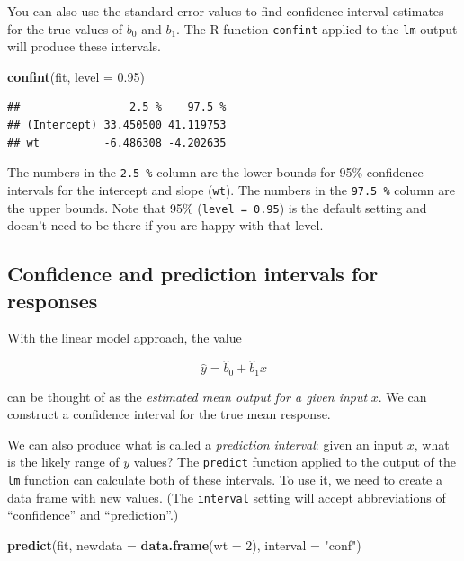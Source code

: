 \documentclass[
]{book}
\newenvironment{Shaded}{\begin{snugshade}}{\end{snugshade}}
\newcommand{\AttributeTok}[1]{\textcolor[rgb]{0.13,0.29,0.53}{#1}}
\newcommand{\DecValTok}[1]{\textcolor[rgb]{0.00,0.00,0.81}{#1}}
\newcommand{\FloatTok}[1]{\textcolor[rgb]{0.00,0.00,0.81}{#1}}
\newcommand{\FunctionTok}[1]{\textcolor[rgb]{0.13,0.29,0.53}{\textbf{#1}}}
\newcommand{\NormalTok}[1]{#1}
\newcommand{\StringTok}[1]{\textcolor[rgb]{0.31,0.60,0.02}{#1}}
\theoremstyle{definition}
\theoremstyle{definition}
\theoremstyle{definition}
\theoremstyle{definition}
\theoremstyle{remark}
\begin{document}
You can also use the standard error values to find confidence interval estimates for the true values of \(b_0\) and \(b_1\). The R function \texttt{confint} applied to the \texttt{lm} output will produce these intervals.

\begin{Shaded}
\begin{Highlighting}[]
\FunctionTok{confint}\NormalTok{(fit, }\AttributeTok{level =} \FloatTok{0.95}\NormalTok{)}
\end{Highlighting}
\end{Shaded}

\begin{verbatim}
##                 2.5 %    97.5 %
## (Intercept) 33.450500 41.119753
## wt          -6.486308 -4.202635
\end{verbatim}

The numbers in the \texttt{2.5\ \%} column are the lower bounds for 95\% confidence intervals for the intercept and slope (\texttt{wt}). The numbers in the \texttt{97.5\ \%} column are the upper bounds. Note that 95\% (\texttt{level\ =\ 0.95}) is the default setting and doesn't need to be there if you are happy with that level.

\subsection*{Confidence and prediction intervals for responses}\label{confidence-and-prediction-intervals-for-responses}

With the linear model approach, the value

\[\hat{y}=\hat{b}_0+\hat{b}_1x\]

can be thought of as the \emph{estimated mean output for a given input} \(x\). We can construct a confidence interval for the true mean response.

We can also produce what is called a \emph{prediction interval}: given an input \(x\), what is the likely range of \(y\) values? The \texttt{predict} function applied to the output of the \texttt{lm} function can calculate both of these intervals. To use it, we need to create a data frame with new values. (The \texttt{interval} setting will accept abbreviations of ``confidence'' and ``prediction''.)

\begin{Shaded}
\begin{Highlighting}[]
\FunctionTok{predict}\NormalTok{(fit, }\AttributeTok{newdata =} \FunctionTok{data.frame}\NormalTok{(}\AttributeTok{wt =} \DecValTok{2}\NormalTok{), }\AttributeTok{interval =} \StringTok{"conf"}\NormalTok{)}
\end{Highlighting}
\end{Shaded}
\end{document}
